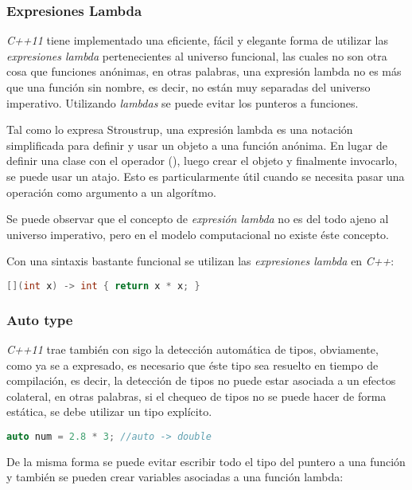 	\subsubsection{Expresiones Lambda}
		\emph{C++11} tiene implementado una eficiente, fácil y elegante forma de utilizar las \emph{expresiones lambda} pertenecientes al universo funcional, las cuales no son otra cosa que funciones anónimas, en otras palabras, una expresión lambda no es más que una función sin nombre, es decir, no están muy separadas del universo imperativo. Utilizando \emph{lambdas} se puede evitar los punteros a funciones.
		
		Tal como lo expresa Stroustrup, una expresión lambda es una notación simplificada para definir y usar un objeto a una función anónima. En lugar de definir una clase con el operador (), luego crear el objeto y finalmente invocarlo, se puede usar un atajo. Esto es particularmente útil cuando se necesita pasar una operación como argumento a un algorítmo.\cite{Bjarne}
		
		Se puede observar que el concepto de \emph{expresión lambda} no es del todo ajeno al universo imperativo, pero en el modelo computacional no existe éste concepto.
		
		Con una sintaxis bastante funcional se utilizan las \emph{expresiones lambda} en \emph{C++}:
		
		\begin{lstlisting}[language=C++, caption=Lambda para elevar al cuadrado un número en C++]
			[](int x) -> int { return x * x; }
		\end{lstlisting}
	
	\subsubsection{Auto type}
		\emph{C++11} trae también con sigo la detección automática de tipos, obviamente, como ya se a expresado, es necesario que éste tipo sea resuelto en tiempo de compilación, es decir, la detección de tipos no puede estar asociada a un efectos colateral, en otras palabras, si el chequeo de tipos no se puede hacer de forma estática, se debe utilizar un tipo explícito.
	
		\begin{lstlisting}[language=C++, caption=Auto type en C++]
			auto num = 2.8 * 3; //auto -> double
		\end{lstlisting}
		
		De la misma forma se puede evitar escribir todo el tipo del puntero a una función y también se pueden crear variables asociadas a una función lambda:
		
